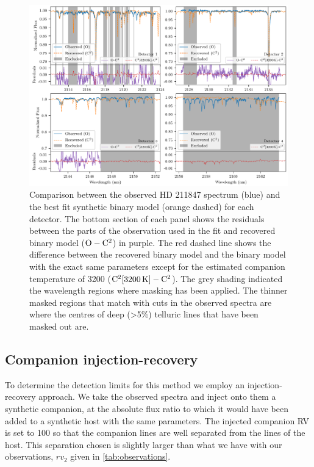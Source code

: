 \begin{figure}
    \centering
    \includegraphics[width=0.7\linewidth]{figures/companion_recovery/visualize_result_residuals}
    \caption[Comparison between observation of {HD 211847} and the best fit synthetic binary model.]{Comparison between the observed {HD 211847} spectrum (blue) and the best fit synthetic binary model (orange dashed) for each detector.
        The bottom section of each panel shows the residuals between the parts of the observation used in the \textchisquared{} fit and recovered binary model (\(\rm O-C^2\)) in purple.
        The red dashed line shows the difference between the recovered binary model and the binary model with the exact same parameters except for the estimated companion temperature of 3200\K{} (\(\rm C^2[3200\,\si{\kelvin}{}]- C^2\)).
        The grey shading indicated the wavelength regions where masking has been applied.
        The thinner masked regions that match with cuts in the observed spectra are where the centres of deep (>5\%) telluric lines that have been masked out are.}
    \label{fig:visualinspection-hd2118471}
\end{figure}


\subsection{Companion injection-recovery}
\label{subsec:injection-recovery}
To determine the detection limits for this method we employ an injection-recovery approach.
We take the observed spectra and inject onto them a synthetic companion, at the absolute flux ratio to which it would have been added to a synthetic host with the same parameters.
The injected companion {RV} is set to 100\kmps{} so that the companion lines are well separated from the lines of the host.
This separation chosen is slightly larger than what we have with our observations, \(rv_2\) given in \cref{tab:observations}.

